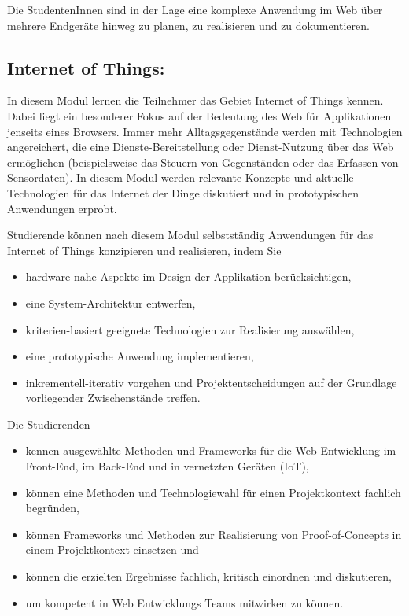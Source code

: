 Die StudentenInnen sind in der Lage eine komplexe Anwendung im Web über
mehrere Endgeräte hinweg zu planen, zu realisieren und zu dokumentieren.

\subsection*{Internet of Things:}\label{internet-of-things}

In diesem Modul lernen die Teilnehmer das Gebiet Internet of Things
kennen. Dabei liegt ein besonderer Fokus auf der Bedeutung des Web für
Applikationen jenseits eines Browsers. Immer mehr Alltagsgegenstände
werden mit Technologien angereichert, die eine Dienste-Bereitstellung
oder Dienst-Nutzung über das Web ermöglichen (beispielsweise das Steuern
von Gegenständen oder das Erfassen von Sensordaten). In diesem Modul
werden relevante Konzepte und aktuelle Technologien für das Internet der
Dinge diskutiert und in prototypischen Anwendungen erprobt.

Studierende können nach diesem Modul selbstständig Anwendungen für das
Internet of Things konzipieren und realisieren, indem Sie

\begin{itemize}
\item
  hardware-nahe Aspekte im Design der Applikation berücksichtigen,
\item
  eine System-Architektur entwerfen,
\item
  kriterien-basiert geeignete Technologien zur Realisierung auswählen,
\item
  eine prototypische Anwendung implementieren,
\item
  inkrementell-iterativ vorgehen und Projektentscheidungen auf der
  Grundlage vorliegender Zwischenstände treffen.
\end{itemize}

Die Studierenden

\begin{itemize}
\item
  kennen ausgewählte Methoden und Frameworks für die Web Entwicklung im
  Front-End, im Back-End und in vernetzten Geräten (IoT),
\item
  können eine Methoden und Technologiewahl für einen Projektkontext
  fachlich begründen,
\item
  können Frameworks und Methoden zur Realisierung von Proof-of-Concepts
  in einem Projektkontext einsetzen und
\item
  können die erzielten Ergebnisse fachlich, kritisch einordnen und
  diskutieren,
\item
  um kompetent in Web Entwicklungs Teams mitwirken zu können.
\end{itemize}

